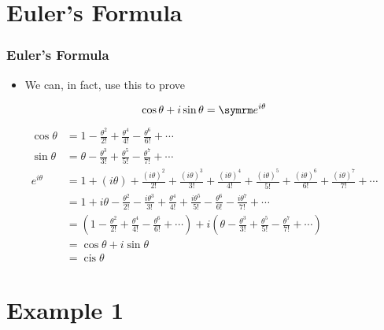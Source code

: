 \documentclass{beamer}
\DeclareMathOperator\cis{cis}
\begin{document}
\section{Euler's Formula}

\begin{frame}
  \frametitle{Euler's Formula}
  \begin{itemize}
    \item We can, in fact, use this to prove
  \end{itemize}
  \begin{equation*}
    \cos \theta + i\sin \theta = \e^{i\theta}
  \end{equation*}
  \begin{align*}
    \cos \theta & = 1 - \frac{\theta^2}{2!} + \frac{\theta^4}{4!} - \frac{\theta^6}{6!} + \cdots \\
    \sin \theta & = \theta - \frac{\theta^3}{3!} + \frac{\theta^5}{5!} - \frac{\theta^7}{7!} + \cdots \\
    e^{i\theta} & = 1 + (i\theta) + \frac{(i\theta)^2}{2!} + \frac{(i\theta)^3}{3!} + \frac{(i\theta)^4}{4!} + \frac{(i\theta)^5}{5!} + \frac{(i\theta)^6}{6!} + \frac{(i\theta)^7}{7!} + \cdots \\
    & = 1 + i\theta - \frac{\theta^2}{2!} - \frac{i\theta^3}{3!} + \frac{\theta^4}{4!} + \frac{i\theta^5}{5!} - \frac{\theta^6}{6!} - \frac{i\theta^7}{7!} + \cdots \\
    & = \left(1 - \frac{\theta^2}{2!} + \frac{\theta^4}{4!} - \frac{\theta^6}{6!} + \cdots\right) + i\left(\theta - \frac{\theta^3}{3!} + \frac{\theta^5}{5!} - \frac{\theta^7}{7!} + \cdots\right) \\
    & = \cos \theta + i\sin \theta \\
    & = \cis \theta
  \end{align*}
\end{frame}

\section{Example 1}
\end{document}

